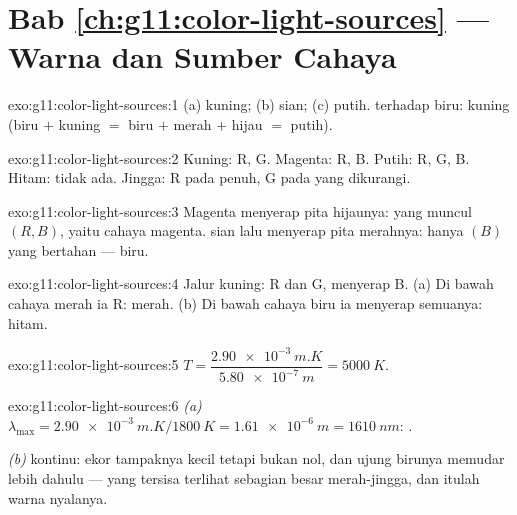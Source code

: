 \section*{Bab \ref{ch:g11:color-light-sources} --- Warna dan Sumber Cahaya}

\begin{solution}{exo:g11:color-light-sources:1}
(a) kuning; (b) sian; (c) putih.  terhadap biru: kuning
(biru $+$ kuning $=$ biru $+$ merah $+$ hijau $=$ putih).
\end{solution}

\begin{solution}{exo:g11:color-light-sources:2}
Kuning: R, G. Magenta: R, B. Putih: R, G, B. Hitam: tidak ada. Jingga:
R pada  penuh, G pada  yang dikurangi.
\end{solution}

\begin{solution}{exo:g11:color-light-sources:3}
Magenta menyerap pita hijaunya: yang muncul $(R, B)$, yaitu cahaya
magenta.  sian lalu menyerap pita merahnya: hanya $(B)$ yang
bertahan --- biru.
\end{solution}

\begin{solution}{exo:g11:color-light-sources:4}
Jalur kuning:  R dan G, menyerap B. (a) Di bawah cahaya
merah ia  R: merah. (b) Di bawah cahaya biru ia menyerap
semuanya: hitam.
\end{solution}

\begin{solution}{exo:g11:color-light-sources:5}
$T = \dfrac{\qty{2.90e-3}{m.K}}{\qty{5.80e-7}{m}} = \qty{5000}{K}$.
\end{solution}

\begin{solution}{exo:g11:color-light-sources:6}
\emph{(a)} $\lambda_{\max} = \qty{2.90e-3}{m.K}/\qty{1800}{K}
= \qty{1.61e-6}{m} = \qty{1610}{nm}$: .

\emph{(b)}  kontinu: ekor tampaknya kecil tetapi bukan nol,
dan ujung birunya memudar lebih dahulu --- yang tersisa terlihat
sebagian besar merah-jingga, dan itulah warna nyalanya.
\end{solution}

